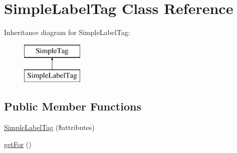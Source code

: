 \hypertarget{class_simple_label_tag}{
\section{SimpleLabelTag Class Reference}
\label{class_simple_label_tag}
}
Inheritance diagram for SimpleLabelTag:\begin{figure}[H]
\begin{center}
\leavevmode
\includegraphics[height=2.000000cm]{class_simple_label_tag}
\end{center}
\end{figure}
\subsection*{Public Member Functions}
\begin{DoxyCompactItemize}
\item 
\hyperlink{class_simple_label_tag_a9749e578425d7026c0237df30a0af2ea}{SimpleLabelTag} (\$attributes)
\item 
\hyperlink{class_simple_label_tag_ab86db623cb49207a9a56250590a82444}{getFor} ()
\end{DoxyCompactItemize}



